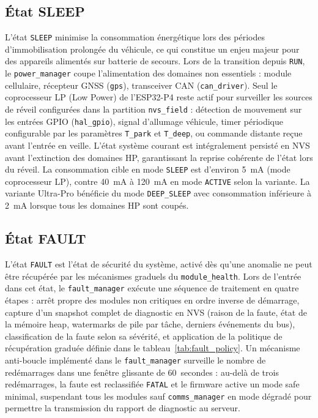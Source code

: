 \subsection{État SLEEP}
\label{subsec:fsm_sleep}

L'état \texttt{SLEEP} minimise la consommation énergétique lors des
périodes d'immobilisation prolongée du véhicule, ce qui constitue
un enjeu majeur pour des appareils alimentés sur batterie de secours.
Lors de la transition depuis \texttt{RUN}, le \texttt{power\_manager}
coupe l'alimentation des domaines non essentiels : module cellulaire,
récepteur GNSS (\texttt{gps}), transceiver CAN (\texttt{can\_driver}).
Seul le coprocesseur LP (Low Power) de l'ESP32-P4 reste actif pour
surveiller les sources de réveil configurées dans la partition
\texttt{nvs\_field} : détection de mouvement sur les entrées GPIO
(\texttt{hal\_gpio}), signal d'allumage véhicule, timer périodique
configurable par les paramètres \texttt{T\_park} et \texttt{T\_deep},
ou commande distante reçue avant l'entrée en veille. L'état système
courant est intégralement persisté en NVS avant l'extinction des
domaines HP, garantissant la reprise cohérente de l'état lors du
réveil. La consommation cible en mode \texttt{SLEEP} est d'environ
5~mA (mode coprocesseur LP), contre 40~mA à 120~mA en mode
\texttt{ACTIVE} selon la variante. La variante Ultra-Pro bénéficie
du mode \texttt{DEEP\_SLEEP} avec consommation inférieure à 2~mA
lorsque tous les domaines HP sont coupés.

\subsection{État FAULT}
\label{subsec:fsm_fault}

L'état \texttt{FAULT} est l'état de sécurité du système, activé dès
qu'une anomalie ne peut être récupérée par les mécanismes graduels
du \texttt{module\_health}. Lors de l'entrée dans cet état, le
\texttt{fault\_manager} exécute une séquence de traitement en quatre
étapes : arrêt propre des modules non critiques en ordre inverse de
démarrage, capture d'un snapshot complet de diagnostic en NVS
(raison de la faute, état de la mémoire heap, watermarks de pile
par tâche, derniers événements du bus), classification de la faute
selon sa sévérité, et application de la politique de récupération
graduée définie dans le tableau~\ref{tab:fault_policy}. Un mécanisme
anti-boucle implémenté dans le \texttt{fault\_manager} surveille le
nombre de redémarrages dans une fenêtre glissante de 60~secondes :
au-delà de trois redémarrages, la faute est reclassifiée \texttt{FATAL}
et le firmware active un mode safe minimal, suspendant tous les
modules sauf \texttt{comms\_manager} en mode dégradé pour permettre
la transmission du rapport de diagnostic au serveur.

